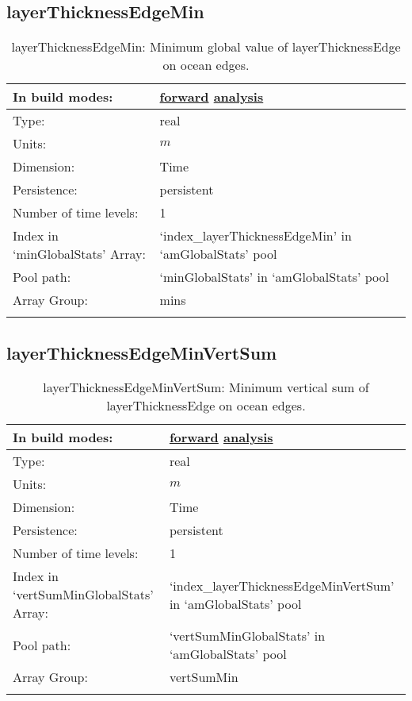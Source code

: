 \subsection[layerThicknessEdgeMin]{layerThicknessEdgeMin}
\label{subsec:var_sec_amGlobalStats_layerThicknessEdgeMin}
\begin{center}
\begin{longtable}{| p{2.0in} | p{4.0in} |}
        \hline 
        In build modes: & \hyperref[subsec:forward_var_tab_amGlobalStats]{forward} \hyperref[subsec:analysis_var_tab_amGlobalStats]{analysis} \\
        \hline 
        Type: & real \\
        \hline 
        Units: & $m$ \\
        \hline 
        Dimension: & Time \\
        \hline 
        Persistence: & persistent \\
        \hline 
        Number of time levels: & 1 \\
        \hline 
		 Index in `minGlobalStats' Array: & `index\_layerThicknessEdgeMin' in `amGlobalStats' pool \\
		 \hline 
            Pool path: & `minGlobalStats' in `amGlobalStats' pool \\
		 \hline 
		 Array Group: & mins \\
		 \hline 
    \caption{layerThicknessEdgeMin: Minimum global value of layerThicknessEdge on ocean edges.}
\end{longtable}
\end{center}
\subsection[layerThicknessEdgeMinVertSum]{layerThicknessEdgeMinVertSum}
\label{subsec:var_sec_amGlobalStats_layerThicknessEdgeMinVertSum}
\begin{center}
\begin{longtable}{| p{2.0in} | p{4.0in} |}
        \hline 
        In build modes: & \hyperref[subsec:forward_var_tab_amGlobalStats]{forward} \hyperref[subsec:analysis_var_tab_amGlobalStats]{analysis} \\
        \hline 
        Type: & real \\
        \hline 
        Units: & $m$ \\
        \hline 
        Dimension: & Time \\
        \hline 
        Persistence: & persistent \\
        \hline 
        Number of time levels: & 1 \\
        \hline 
		 Index in `vertSumMinGlobalStats' Array: & `index\_layerThicknessEdgeMinVertSum' in `amGlobalStats' pool \\
		 \hline 
            Pool path: & `vertSumMinGlobalStats' in `amGlobalStats' pool \\
		 \hline 
		 Array Group: & vertSumMin \\
		 \hline 
    \caption{layerThicknessEdgeMinVertSum: Minimum vertical sum of layerThicknessEdge on ocean edges.}
\end{longtable}
\end{center}
